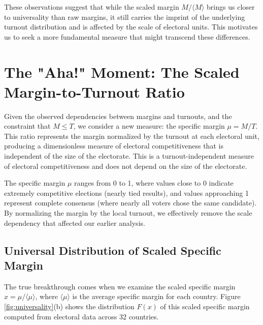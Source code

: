 These observations suggest that while the scaled margin $M/\langle M \rangle$ brings us closer to universality than raw margins, it still carries the imprint of the underlying turnout distribution and is affected by the scale of electoral units. This motivates us to seek a more fundamental measure that might transcend these differences.

\section{The "Aha!" Moment: The Scaled Margin-to-Turnout Ratio}

Given the observed dependencies between margins and turnouts, and the constraint that $M \leq T$, we consider a new measure: the specific margin $\mu = M/T$. This ratio represents the margin normalized by the turnout at each electoral unit, producing a dimensionless measure of electoral competitiveness that is independent of the size of the electorate. This is a turnout-independent measure of electoral competitiveness and does not depend on the size of the electorate.

The specific margin $\mu$ ranges from 0 to 1, where values close to 0 indicate extremely competitive elections (nearly tied results), and values approaching 1 represent complete consensus (where nearly all voters chose the same candidate). By normalizing the margin by the local turnout, we effectively remove the scale dependency that affected our earlier analysis.

\subsection{Universal Distribution of Scaled Specific Margin}

The true breakthrough comes when we examine the scaled specific margin $x = \mu/\langle\mu\rangle$, where $\langle\mu\rangle$ is the average specific margin for each country. Figure \ref{fig:universality}(b) shows the distribution $F(x)$ of this scaled specific margin computed from electoral data across 32 countries.

